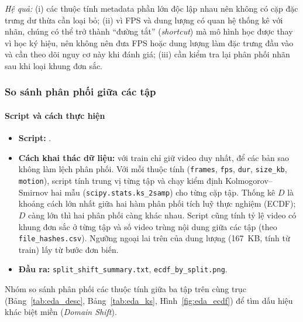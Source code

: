\noindent\textit{Hệ quả:} (i) các thuộc tính metadata phần lớn độc lập nhau nên không có cặp đặc trưng dư thừa cần loại bỏ; (ii) vì FPS và dung lượng có quan hệ thống kê với nhãn, chúng có thể trở thành ``đường tắt'' (\textit{shortcut}) mà mô hình học được thay vì học ký hiệu, nên không nên đưa FPS hoặc dung lượng làm đặc trưng đầu vào và cần theo dõi nguy cơ này khi đánh giá; (iii) cần kiểm tra lại phân phối nhãn sau khi loại khung đơn sắc.

\subsubsection{So sánh phân phối giữa các tập}
\label{subsec:eda_shift}

\paragraph{Script và cách thực hiện}
\begin{itemize}
  \item \textbf{Script:} .
  \item \textbf{Cách khai thác dữ liệu:} với train chỉ giữ video duy nhất, để các bản sao không làm lệch phân phối. Với mỗi thuộc tính (\texttt{frames}, \texttt{fps}, \texttt{dur}, \texttt{size\_kb}, \texttt{motion}), script tính trung vị từng tập và chạy kiểm định Kolmogorov--Smirnov hai mẫu (\texttt{scipy.stats.ks\_2samp}) cho từng cặp tập. Thống kê $D$ là khoảng cách lớn nhất giữa hai hàm phân phối tích luỹ thực nghiệm (ECDF); $D$ càng lớn thì hai phân phối càng khác nhau. Script cũng tính tỷ lệ video có khung đơn sắc ở từng tập và số video trùng nội dung giữa các tập (theo \texttt{file\_hashes.csv}). Ngưỡng ngoại lai trên của dung lượng (167~KB, tính từ train) lấy từ bước đơn biến.
  \item \textbf{Đầu ra:} \texttt{split\_shift\_summary.txt}, \texttt{ecdf\_by\_split.png}.
\end{itemize}

Nhóm so sánh phân phối các thuộc tính giữa ba tập trên cùng trục (Bảng~\ref{tab:eda_desc}, Bảng~\ref{tab:eda_ks}, Hình~\ref{fig:eda_ecdf}) để tìm dấu hiệu khác biệt miền (\textit{Domain Shift}).

